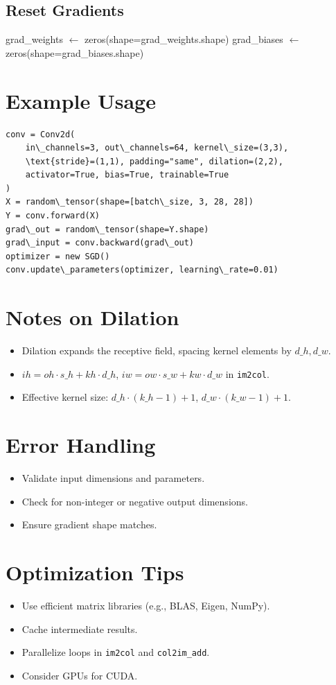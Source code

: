 \documentclass{article}
\begin{document}
\subsection{Reset Gradients}
\begin{algorithm}
\caption{Reset Gradients}
\begin{algorithmic}[1]
        \State grad\_weights $\gets$ zeros(shape=grad\_weights.shape)
            \State grad\_biases $\gets$ zeros(shape=grad\_biases.shape)
        \EndIf
    \EndIf
\EndFunction
\end{algorithmic}
\end{algorithm}

\section{Example Usage}
\begin{verbatim}
conv = Conv2d(
    in\_channels=3, out\_channels=64, kernel\_size=(3,3),
    \text{stride}=(1,1), padding="same", dilation=(2,2),
    activator=True, bias=True, trainable=True
)
X = random\_tensor(shape=[batch\_size, 3, 28, 28])
Y = conv.forward(X)
grad\_out = random\_tensor(shape=Y.shape)
grad\_input = conv.backward(grad\_out)
optimizer = new SGD()
conv.update\_parameters(optimizer, learning\_rate=0.01)
\end{verbatim}

\section{Notes on Dilation}
\begin{itemize}
    \item Dilation expands the receptive field, spacing kernel elements by \(d\_h, d\_w\).
    \item $ih = oh \cdot s\_h + kh \cdot d\_h$, $iw = ow \cdot s\_w + kw \cdot d\_w$ in \texttt{im2col}.
    \item Effective kernel size: $d\_h \cdot (k\_h - 1) + 1$, $d\_w \cdot (k\_w - 1) + 1$.
\end{itemize}

\section{Error Handling}
\begin{itemize}
    \item Validate input dimensions and parameters.
    \item Check for non-integer or negative output dimensions.
    \item Ensure gradient shape matches.
\end{itemize}

\section{Optimization Tips}
\begin{itemize}
    \item Use efficient matrix libraries (e.g., BLAS, Eigen, NumPy).
    \item Cache intermediate results.
    \item Parallelize loops in \texttt{im2col} and \texttt{col2im\_add}.
    \item Consider GPUs for CUDA.
\end{itemize}
\end{document}
